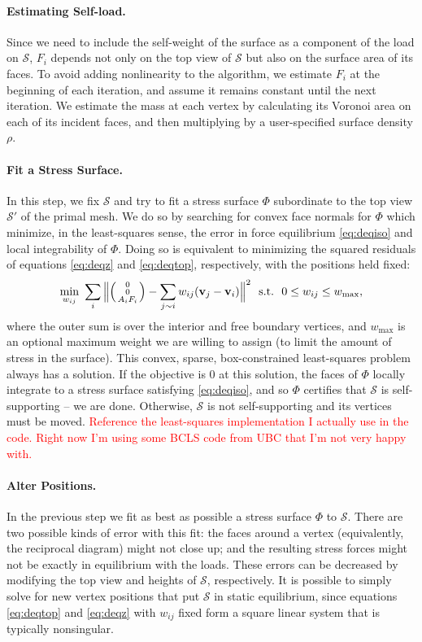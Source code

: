\documentclass[annual]{acmsiggraph}
\makeatletter
\def\Forcevector{\Big(\mbox{\scriptsize
	\def\arraystretch{0.8}\begin{tabular}{@{\,}c@{\,}}
	0 \\ 0 \\ $A_i F_i$
	\end{tabular}}\Big)}
\def\SS{{\mathcal S}}
\newcommand{\todo}[1]{\textcolor{red}{#1}}
\makeatother
\begin{document}
\paragraph{Estimating Self-load.}

Since we need to include the self-weight of the surface as a component of 
the load on $\SS$, $F_i$ depends not only on the top view of $\SS$ but 
also on the surface area of its faces. To avoid adding nonlinearity to the 
algorithm, we estimate $F_i$ at the beginning of each iteration, and 
assume it remains constant until the next iteration. We estimate the mass 
at each vertex by calculating its Voronoi area on each of its incident 
faces, and then multiplying by a user-specified surface density $\rho$.

\paragraph{Fit a Stress Surface.} In this step, we fix $\SS$ and try to 
fit a stress surface $\Phi$ subordinate to the top view $\SS'$ of the 
primal mesh. We do so by searching for convex face normals for $\Phi$ 
which minimize, in the least-squares sense, the error in force equilibrium 
\eqref{eq:deqiso} and local integrability of $\Phi$. Doing so is 
equivalent to minimizing the squared residuals of equations 
\eqref{eq:deqz} and \eqref{eq:deqtop}, respectively, with the positions 
held fixed:
	\begin{align*}
	\min_{w_{ij}}\ 
	\sum_i 
	\Big\| \Forcevector -
		\sum_{j\sim i} w_{ij} (\vw_j-\vw_i) \Big\|^2
	\ \
	\textrm{s.t.}\ \
		0 \leq w_{ij} \leq w_{\max},
\end{align*}
 where the outer sum is over the interior and free boundary vertices, and 
$w_\textrm{max}$ is an optional maximum weight we are willing to assign 
(to limit the amount of stress in the surface). This convex, sparse, 
box-constrained least-squares problem always has a solution. If the 
objective is $0$ at this solution, the faces of $\Phi$ locally integrate 
to a stress surface satisfying \eqref{eq:deqiso}, and so $\Phi$ certifies 
that $\SS$ is self-supporting -- we are done. Otherwise, $\SS$ is not 
self-supporting and its vertices must be moved. \todo{Reference the 
least-squares implementation I actually use in the code. Right now I'm 
using some BCLS code from UBC that I'm not very happy with.}

\paragraph{Alter Positions.} In the previous step we fit as best as 
possible a stress surface $\Phi$ to $\SS$. There are two possible kinds of 
error with this fit: the faces around a vertex (equivalently, the 
reciprocal diagram) might not close up; and the resulting stress forces 
might not be exactly in equilibrium with the loads. These errors can be 
decreased by modifying the top view and heights of $\SS$, respectively. It 
is possible to simply solve for new vertex positions that put $\SS$ in 
static equilibrium, since equations \eqref{eq:deqtop} and \eqref{eq:deqz} 
with $w_{ij}$ fixed form a square linear system that is typically 
nonsingular.
\end{document}
